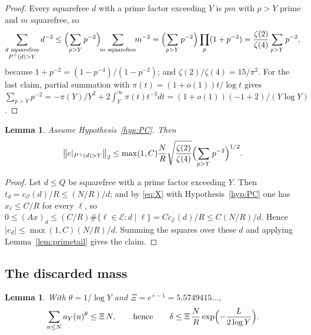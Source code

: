 \documentclass[11pt,a4paper]{article}
\theoremstyle{plain}
\newtheorem{lemma}[theorem]{Lemma}
\theoremstyle{definition}
\theoremstyle{remark}
\newcommand{\Pp}{P^{+}}
\newcommand{\vB}{\mathcal{E}}
\newcommand{\vR}{\mathcal{O}}
\begin{document}
\begin{proof}
Every squarefree $d$ with a prime factor exceeding $Y$ is $pm$ with $p>Y$ prime and $m$ squarefree, so
\[
  \sum_{\substack{d\ \text{squarefree}\\ \Pp(d)>Y}}d^{-2}
  \le\Bigl(\sum_{p>Y}p^{-2}\Bigr)\!\!\sum_{m\ \text{squarefree}}\!\!m^{-2}
  =\Bigl(\sum_{p>Y}p^{-2}\Bigr)\prod_{p}(1+p^{-2})=\frac{\zeta(2)}{\zeta(4)}\sum_{p>Y}p^{-2},
\]
because $1+p^{-2}=(1-p^{-4})/(1-p^{-2})$; and $\zeta(2)/\zeta(4)=15/\pi^{2}$. For the last claim, partial
summation with $\pi(t)=(1+o(1))t/\log t$ gives
$\sum_{p>Y}p^{-2}=-\pi(Y)/Y^{2}+2\int_{Y}^{\infty}\pi(t)t^{-3}dt=(1+o(1))(-1+2)/(Y\log Y)$.
\end{proof}

\begin{lemma}\label{lem:rough}
Assume Hypothesis~\ref{hyp:PC}. Then
\[
  \bigl\|e|_{\Pp(d)>Y}\bigr\|_{2}\le\max(1,C)\frac NR\sqrt{\frac{\zeta(2)}{\zeta(4)}}
  \Bigl(\sum_{p>Y}p^{-2}\Bigr)^{1/2}.
\]
\end{lemma}

\begin{proof}
Let $d\le Q$ be squarefree with a prime factor exceeding $Y$. Then $t_{d}=c_{\vR}(d)/R\le(N/R)/d$; and by
\eqref{eq:X} with Hypothesis~\ref{hyp:PC} one has $x_{\ell}\le C/R$ for every $\ell$, so
$0\le(Ax)_{d}\le(C/R)\#\{\ell\in\vB:d\mid\ell\}=Cc_{\vB}(d)/R\le C(N/R)/d$. Hence
$|e_{d}|\le\max(1,C)(N/R)/d$. Summing the squares over these $d$ and applying
Lemma~\ref{lem:primetail} gives the claim.
\end{proof}

\subsection{The discarded mass}\label{sec:discarded}

\begin{lemma}\label{lem:rank}
With $\theta=1/\log Y$ and $\Xi=e^{\,e-1}=5.5749415\ldots$,
\[
  \sum_{n\le N}a_{Y}(n)^{\theta}\le\Xi\,N,
  \qquad\text{hence}\qquad
  \delta\le\Xi\,\frac NR\exp\Bigl(-\frac L{2\log Y}\Bigr).
\]
\end{lemma}
\end{document}
